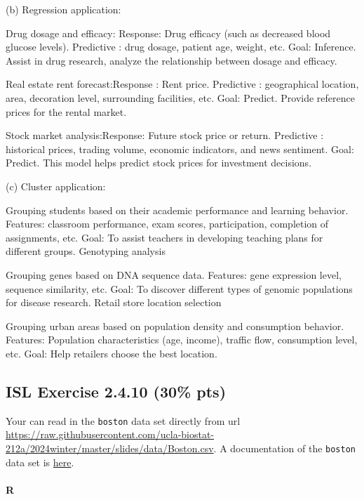\documentclass[
]{article}
\let\oldparagraph\paragraph
\renewcommand{\paragraph}[1]{\oldparagraph{#1}\mbox{}}
\begin{document}
(b) Regression application:

Drug dosage and efficacy: Response: Drug efficacy (such as decreased
blood glucose levels). Predictive : drug dosage, patient age, weight,
etc. Goal: Inference. Assist in drug research, analyze the relationship
between dosage and efficacy.

Real estate rent forecast:Response : Rent price. Predictive :
geographical location, area, decoration level, surrounding facilities,
etc. Goal: Predict. Provide reference prices for the rental market.

Stock market analysis:Response: Future stock price or return. Predictive
: historical prices, trading volume, economic indicators, and news
sentiment. Goal: Predict. This model helps predict stock prices for
investment decisions.

(c) Cluster application:

Grouping students based on their academic performance and learning
behavior. Features: classroom performance, exam scores, participation,
completion of assignments, etc. Goal: To assist teachers in developing
teaching plans for different groups. Genotyping analysis

Grouping genes based on DNA sequence data. Features: gene expression
level, sequence similarity, etc. Goal: To discover different types of
genomic populations for disease research. Retail store location
selection

Grouping urban areas based on population density and consumption
behavior. Features: Population characteristics (age, income), traffic
flow, consumption level, etc. Goal: Help retailers choose the best
location.

\hypertarget{isl-exercise-2.4.10-30-pts}{%
\subsection{ISL Exercise 2.4.10 (30\%
pts)}\label{isl-exercise-2.4.10-30-pts}}

Your can read in the \texttt{boston} data set directly from url
\url{https://raw.githubusercontent.com/ucla-biostat-212a/2024winter/master/slides/data/Boston.csv}.
A documentation of the \texttt{boston} data set is
\href{https://www.rdocumentation.org/packages/ISLR2/versions/1.3-2/topics/Boston}{here}.

\paragraph{R}
\end{document}
